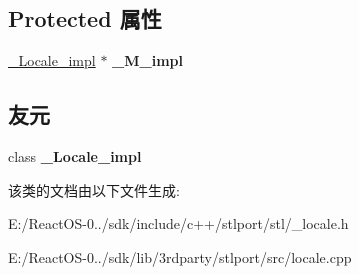 \subsection*{Protected 属性}
\begin{DoxyCompactItemize}
\item 
\mbox{\label{classlocale_a64ce7120a3926edc756795f787bbdf3f}} 
\hyperlink{class___locale__impl}{\+\_\+\+Locale\+\_\+impl} $\ast$ {\bfseries \+\_\+\+M\+\_\+impl}
\end{DoxyCompactItemize}
\subsection*{友元}
\begin{DoxyCompactItemize}
\item 
\mbox{\label{classlocale_ae9c09ac7cd16ad35f8fdb1587ac77eb8}} 
class {\bfseries \+\_\+\+Locale\+\_\+impl}
\end{DoxyCompactItemize}


该类的文档由以下文件生成\+:\begin{DoxyCompactItemize}
\item 
E\+:/\+React\+O\+S-\/0../sdk/include/c++/stlport/stl/\+\_\+locale.\+h\item 
E\+:/\+React\+O\+S-\/0../sdk/lib/3rdparty/stlport/src/locale.\+cpp\end{DoxyCompactItemize}
